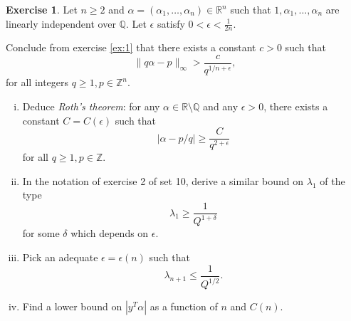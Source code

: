 \documentclass[12pt,a4paper]{article}
\theoremstyle{plain}
\newtheorem*{Sol*}{Solution}
\theoremstyle{definition}
\newtheorem{Ex}{Exercise}
\def \Q {\mathbb Q}
\def \R {\mathbb R}
\def \Z {\mathbb Z}
\newif\ifsolutions
\newcommand{\exercise}[2]{
			\begin{Ex} #1 \end{Ex}
			\ifsolutions  \begin{Sol*} #2 \end{Sol*} \bigskip \else \bigskip  \fi
		}
\begin{document}
\exercise{

	Let $n\geq2$ and $\alpha = (\alpha_1, \dots, \alpha_n) \in \R^n$ such that $1, \alpha_1, \dots, \alpha_n$ are linearly independent over $\Q$. 
	Let $\epsilon$ satisfy $0 < \epsilon < \frac{1}{2n}$.

	Conclude from exercise \ref{ex:1} that there exists a constant $c > 0$ such that
		\[ \| q \alpha - p \|_\infty > \frac{c}{q^{1/n + \epsilon}}, \]
	for all integers $q \geq 1, p \in \Z^n$.

	\begin{enumerate}[i)]
		\item Deduce \emph{Roth's theorem}: for any $\alpha \in \R\setminus\Q$ and any $\epsilon>0$, there exists a constant $C=C(\epsilon)$ such that
			\[ | \alpha - p/q | \geq \frac{C}{q^{2+\epsilon}} \]
		for all $q\geq1, p\in\Z$.
		
		\item In the notation of exercise 2 of set 10, derive a similar bound on $\lambda_1$ of the type
			\[ \lambda_1 \geq \frac{1}{Q^{1+\delta}} \]
		for some $\delta$ which depends on $\epsilon$.

		\item Pick an adequate $\epsilon = \epsilon(n)$ such that 
			\[ \lambda_{n+1} \leq \frac{1}{Q^{1/2}}. \]
		
		\item Find a lower bound on $|y^T \alpha|$ as a function of $n$ and $C(n)$.

	\end{enumerate}
}
{}
\end{document}
